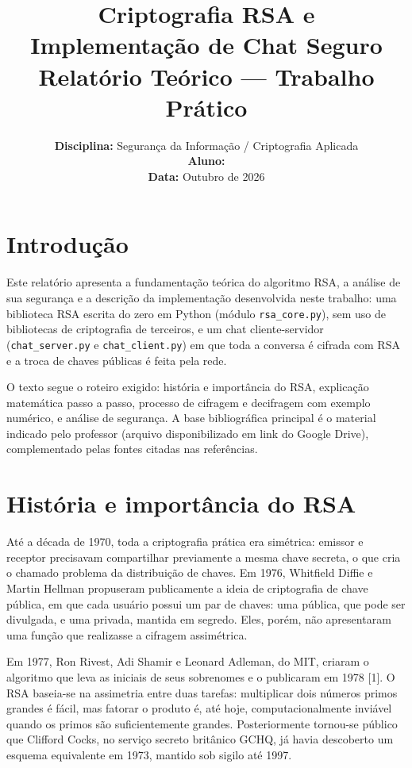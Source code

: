 \documentclass[11pt, a4paper]{article}
\title{
    \vspace{-1.5cm}
    \color{primaryColor}\huge\bfseries Criptografia RSA e\\Implementação de Chat Seguro\\[0.3em]
    \large\color{accentColor}Relatório Teórico --- Trabalho Prático
}
\author{\textbf{Disciplina:} Segurança da Informação / Criptografia Aplicada \\ \textbf{Aluno:} \underline{\hspace{6cm}} \\ \textbf{Data:} Outubro de 2026}
\date{}
\begin{document}
\maketitle
\thispagestyle{fancy}

\vspace{-0.5cm}

\section{Introdução}
Este relatório apresenta a fundamentação teórica do algoritmo RSA, a análise de sua segurança e a descrição da implementação desenvolvida neste trabalho: uma biblioteca RSA escrita do zero em Python (módulo \texttt{rsa\_core.py}), sem uso de bibliotecas de criptografia de terceiros, e um chat cliente-servidor (\texttt{chat\_server.py} e \texttt{chat\_client.py}) em que toda a conversa é cifrada com RSA e a troca de chaves públicas é feita pela rede.

O texto segue o roteiro exigido: história e importância do RSA, explicação matemática passo a passo, processo de cifragem e decifragem com exemplo numérico, e análise de segurança. A base bibliográfica principal é o material indicado pelo professor (arquivo disponibilizado em link do Google Drive), complementado pelas fontes citadas nas referências.

\section{História e importância do RSA}
Até a década de 1970, toda a criptografia prática era simétrica: emissor e receptor precisavam compartilhar previamente a mesma chave secreta, o que cria o chamado problema da distribuição de chaves. Em 1976, Whitfield Diffie e Martin Hellman propuseram publicamente a ideia de criptografia de chave pública, em que cada usuário possui um par de chaves: uma pública, que pode ser divulgada, e uma privada, mantida em segredo. Eles, porém, não apresentaram uma função que realizasse a cifragem assimétrica.

Em 1977, Ron Rivest, Adi Shamir e Leonard Adleman, do MIT, criaram o algoritmo que leva as iniciais de seus sobrenomes e o publicaram em 1978 [1]. O RSA baseia-se na assimetria entre duas tarefas: multiplicar dois números primos grandes é fácil, mas fatorar o produto é, até hoje, computacionalmente inviável quando os primos são suficientemente grandes. Posteriormente tornou-se público que Clifford Cocks, no serviço secreto britânico GCHQ, já havia descoberto um esquema equivalente em 1973, mantido sob sigilo até 1997.
\end{document}
